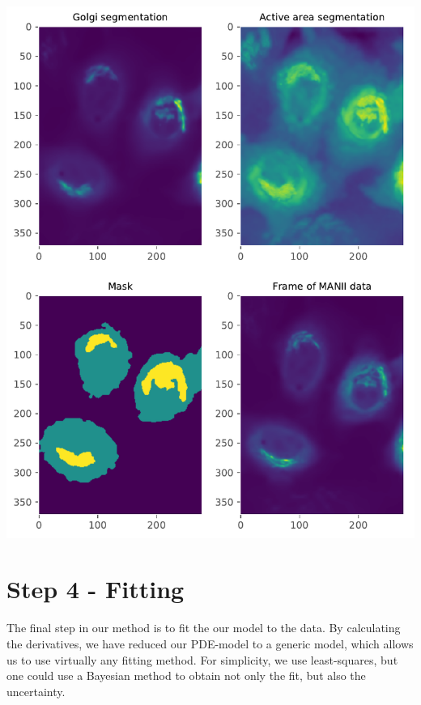 \documentclass[12pt,a4paper,]{Dissertate}
\let\origfigure\figure
\let\endorigfigure\endfigure
\renewenvironment{figure}[1][2] {
    \expandafter\origfigure\expandafter[H]
} {
    \endorigfigure
}
\begin{document}
\begin{figure}
\hypertarget{fig:mask}{%
\centering
\includegraphics{source/figures/pdf/segmenting.pdf}
\caption{Four panels showing the different stages of making the mask.
From segmenting the upper two panels we determine the golgi and active
area, leading to the mask in the lower left. Compare the to the lower
right.}\label{fig:mask}
}
\end{figure}

\hypertarget{step-4---fitting}{%
\section{Step 4 - Fitting}\label{step-4---fitting}}

The final step in our method is to fit the our model to the data. By
calculating the derivatives, we have reduced our PDE-model to a generic
model, which allows us to use virtually any fitting method. For
simplicity, we use least-squares, but one could use a Bayesian method to
obtain not only the fit, but also the uncertainty.
\end{document}
